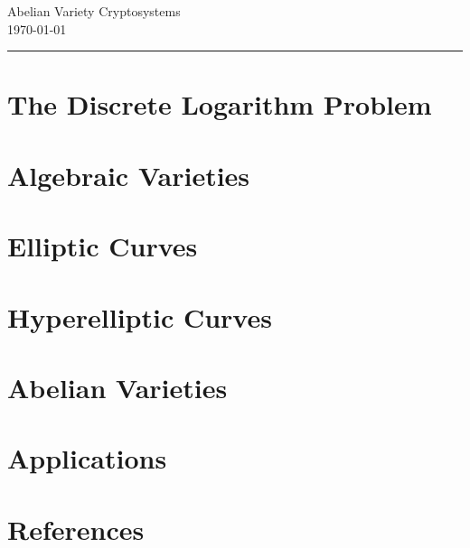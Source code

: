 \documentclass[10pt,a4paper]{report}
\theoremstyle{plain}
\theoremstyle{definition}
\theoremstyle{remark}
\newcommand{\HRule}{\rule{\linewidth}{0.5mm}}
\theoremstyle{definition}
\begin{document}
  {\huge Abelian Variety Cryptosystems} \\
  {\large \today} \\
  \HRule  %

  \tableofcontents
  \newpage
    
    
  \section{The Discrete Logarithm Problem}
    
  \section{Algebraic Varieties}
    
  \section{Elliptic Curves}
    
  \section{Hyperelliptic Curves}
    
  \section{Abelian Varieties}
  \section{Applications}
  \section{References}
    
\end{document}
